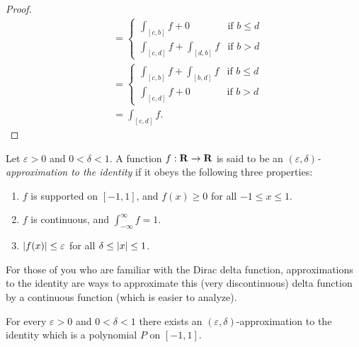 \begin{proof}
\begin{align*}
                            & = \begin{cases}
                                  \int_{[c, b]} f + 0               & \text{if } b \leq d \\
                                  \int_{[c, d]} f + \int_{[d, b]} f & \text{if } b > d
                                \end{cases}                             \\
                            & = \begin{cases}
                                  \int_{[c, b]} f + \int_{[b, d]} f & \text{if } b \leq d \\
                                  \int_{[c, d]} f + 0               & \text{if } b > d
                                \end{cases}                             \\
                            & = \int_{[c, d]} f.
  \end{align*}
\end{proof}

\begin{definition}\label{3.8.6}
  Let \(\varepsilon > 0\) and \(0 < \delta < 1\).
  A function \(f : \mathbf{R} \to \mathbf{R}\) is said to be an \emph{\((\varepsilon, \delta)\)-approximation to the identity} if it obeys the following three properties:
  \begin{enumerate}
    \item \(f\) is supported on \([-1, 1]\), and \(f(x) \geq 0\) for all \(-1 \leq x \leq 1\).
    \item \(f\) is continuous, and \(\int_{-\infty}^\infty f = 1\).
    \item \(\left\lvert f(x)\right\rvert \leq \varepsilon\) for all \(\delta \leq \left\lvert x\right\rvert \leq 1\).
  \end{enumerate}
\end{definition}

\begin{remark}\label{3.8.7}
  For those of you who are familiar with the Dirac delta function, approximations to the identity are ways to approximate this (very discontinuous) delta function by a continuous function (which is easier to analyze).
\end{remark}

\begin{lemma}\label{3.8.8}
  For every \(\varepsilon > 0\) and \(0 < \delta < 1\) there exists an \((\varepsilon, \delta)\)-approximation to the identity which is a polynomial \(P\) on \([-1, 1]\).
\end{lemma}

